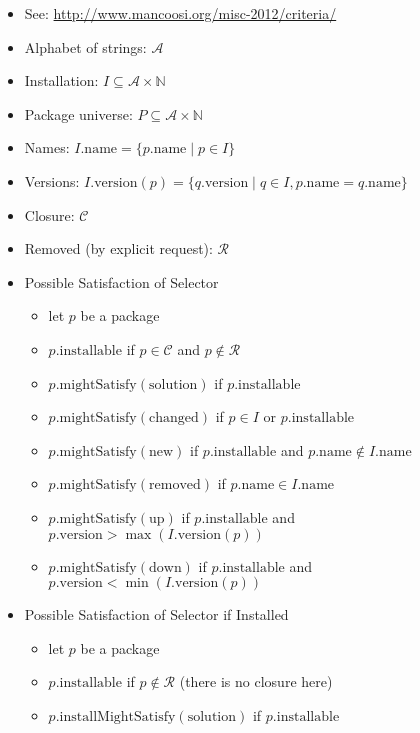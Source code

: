 \documentclass[a4paper,english]{article}
\begin{document}
\begin{itemize}
  \item See: \url{http://www.mancoosi.org/misc-2012/criteria/}
  \item Alphabet of strings: $\mathcal{A}$
  \item Installation: $I\subseteq\mathcal{A}\times\mathbb{N}$
  \item Package universe: $P\subseteq\mathcal{A}\times\mathbb{N}$ 
  \item Names: $I.\mathrm{name}=\{p.\mathrm{name}\mid p\in I\}$
  \item Versions: $I.\mathrm{version}(p)=\{q.\mathrm{version}\mid q\in I,p.\mathrm{name}=q.\mathrm{name}\}$
  \item Closure: $\mathcal{C}$
  \item Removed (by explicit request): $\mathcal{R}$
  \item Possible Satisfaction of Selector
    \begin{itemize}
      \item let $p$ be a package
      \item $p.\mathrm{installable}$ if $p\in \mathcal{C}$ and $p \not\in\mathcal{R}$
      \item $p.\mathrm{mightSatisfy}(\mathrm{solution})$ if $p.\mathrm{installable}$
      \item $p.\mathrm{mightSatisfy}(\mathrm{changed})$ if $p\in I$ or $p.\mathrm{installable}$
      \item $p.\mathrm{mightSatisfy}(\mathrm{new})$ if $p.\mathrm{installable}$ and $p.\mathrm{name}\not\in I.\mathrm{name}$
      \item $p.\mathrm{mightSatisfy}(\mathrm{removed})$ if $p.\mathrm{name}\in I.\mathrm{name}$
      \item $p.\mathrm{mightSatisfy}(\mathrm{up})$ if $p.\mathrm{installable}$ and $p.\mathrm{version}>\max(I.\mathrm{version}(p))$
      \item $p.\mathrm{mightSatisfy}(\mathrm{down})$ if $p.\mathrm{installable}$ and $p.\mathrm{version}<\min(I.\mathrm{version}(p))$
    \end{itemize}
  \item Possible Satisfaction of Selector if Installed
    \begin{itemize}
      \item let $p$ be a package
      \item $p.\mathrm{installable}$ if $p \not\in\mathcal{R}$ (there is no closure here)
      \item $p.\mathrm{installMightSatisfy}(\mathrm{solution})$ if $p.\mathrm{installable}$

\end{itemize}
\end{itemize}
\end{document}

